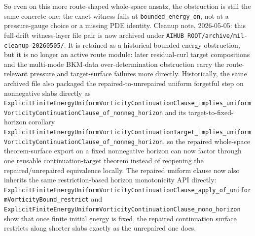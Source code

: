 \documentclass[11pt]{article}
\begin{document}
So even on this more route-shaped whole-space ansatz, the obstruction is still
the same concrete one: the exact witness fails at
\texttt{bounded\_energy\_on}, not at a pressure-gauge choice or a missing PDE
identity.
Cleanup note, 2026-05-05: this full-drift witness-layer file pair is now
archived under
\texttt{AIHUB_ROOT/archive/mil-cleanup-20260505/}.  It is
retained as a historical bounded-energy obstruction, but it is no longer an
active route module: later residual-curl target compositions and the multi-mode
BKM-data over-determination obstruction carry the route-relevant pressure and
target-surface failures more directly.
Historically, the same archived file also packaged the repaired-to-unrepaired
uniform forgetful step on nonnegative slabs directly as
\texttt{ExplicitFiniteEnergyUniformVorticityContinuationClause\_implies\_uniformVorticityContinuationClause\_of\_nonneg\_horizon}
and its target-to-fixed-horizon corollary
\texttt{ExplicitFiniteEnergyUniformVorticityContinuationTarget\_implies\_uniformVorticityContinuationClause\_of\_nonneg\_horizon},
so the repaired whole-space theorem-surface export on a fixed nonnegative
horizon can now factor through one reusable continuation-target theorem instead
of reopening the repaired/unrepaired equivalence locally.
The repaired uniform clause now also inherits the same restriction-based
horizon monotonicity API directly:
\texttt{ExplicitFiniteEnergyUniformVorticityContinuationClause\_apply\_of\_uniformVorticityBound\_restrict}
and
\texttt{ExplicitFiniteEnergyUniformVorticityContinuationClause\_mono\_horizon}
show that once finite initial energy is fixed, the repaired continuation
surface restricts along shorter slabs exactly as the unrepaired one does.
\end{document}
